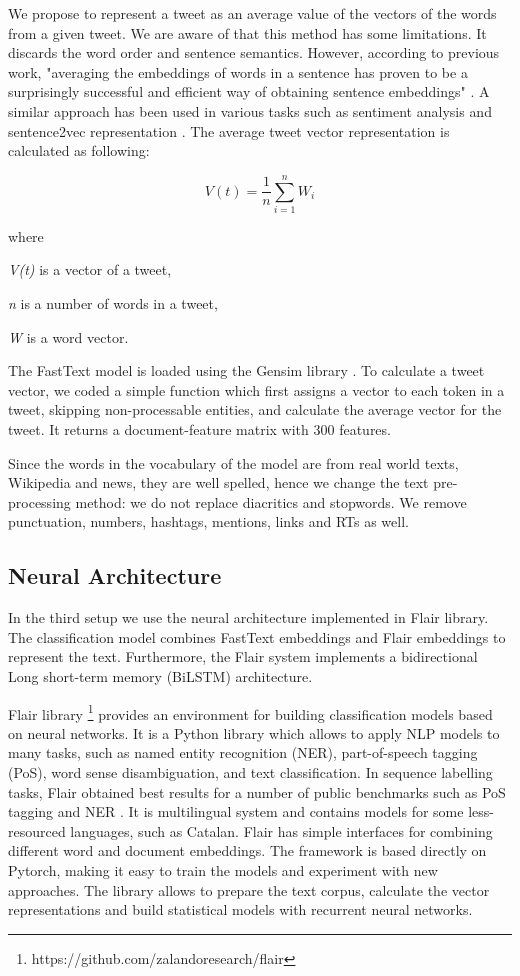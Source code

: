 \documentclass[10pt, a4paper]{article}
\begin{document}
We propose to represent a tweet as an average value of the vectors of the words from a given tweet. We are aware of that this method has some limitations. It discards the word order and sentence semantics. However, according to previous work, "averaging the embeddings of words in a sentence has proven to be a surprisingly successful and efficient way of obtaining sentence embeddings" \cite{DBLP:journals/corr/KenterBR16}. A similar approach has been used in various tasks such as sentiment analysis \cite{Anselmo17,socher-etal-2013-recursive} and sentence2vec representation \cite{Ben-Lhachemi18,DBLP:journals/corr/PagliardiniGJ17}. The average tweet vector representation is calculated as following: 

\[V(t)=\frac{1}{n}\sum_{i=1}^{n}W_{i}\]

where 

\textit{V(t)} is a vector of a tweet, 

\textit{n} is a number of words in a tweet, 

\textit{W} is a word vector. 

The FastText model is loaded using the Gensim library \cite{rehurek_lrec}. To calculate a tweet vector, we coded a simple function which first assigns a vector to each token in a tweet, skipping non-processable entities, and calculate the average vector for the tweet. It returns a document-feature matrix with 300 features. 

Since the words in the vocabulary of the model are from real world texts, Wikipedia and news, they are well spelled, hence we change the text pre-processing method: we do not replace diacritics and stopwords. We remove punctuation, numbers, hashtags, mentions, links and RTs as well. 



\subsection{Neural Architecture}

In the third setup we use the neural architecture implemented in Flair library. The classification model combines FastText embeddings and Flair embeddings to represent the text. Furthermore, the Flair system implements a bidirectional Long short-term memory (BiLSTM) architecture.

Flair library \footnote{https://github.com/zalandoresearch/flair} provides an environment for building classification models based on neural networks. It is a Python library which allows to apply NLP models to many tasks, such as named entity recognition (NER), part-of-speech tagging (PoS), word sense disambiguation, and text classification. In sequence labelling tasks, Flair obtained best results for a number of public benchmarks such as PoS tagging and NER \cite{akbik-etal-2018-contextual}. It is multilingual system and contains models for some less-resourced languages, such as Catalan. Flair has simple interfaces for combining different word and document embeddings. The framework is based directly on Pytorch, making it easy to train the models and experiment with new approaches. The library allows to prepare the text corpus, calculate the vector representations and build statistical models with recurrent neural networks. 
\end{document}
